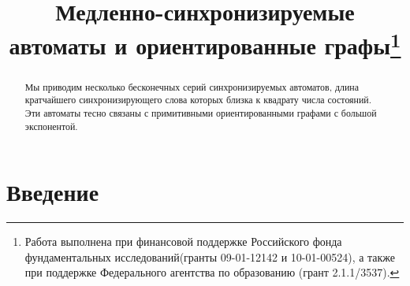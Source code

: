 \documentclass[11pt]{article}
\newcommand{\sa}{synchronizing automata}
\begin{document}
\title{Медленно-синхронизируемые автоматы и ориентированные графы\thanks{Работа выполнена
при финансовой поддержке Российского фонда фундаментальных исследований(гранты 09-01-12142
и 10-01-00524), а также при поддержке Федерального агентства по образованию (грант 2.1.1/3537).}}






\maketitle


\begin{abstract}
Мы приводим несколько бесконечных серий синхронизируемых автоматов, 
длина кратчайшего синхронизирующего слова которых близка к квадрату числа состояний.
Эти автоматы тесно связаны с примитивными ориентированными графами
с большой экспонентой.
\end{abstract}


%



\section{Введение}
\label{intro}
\end{document}
